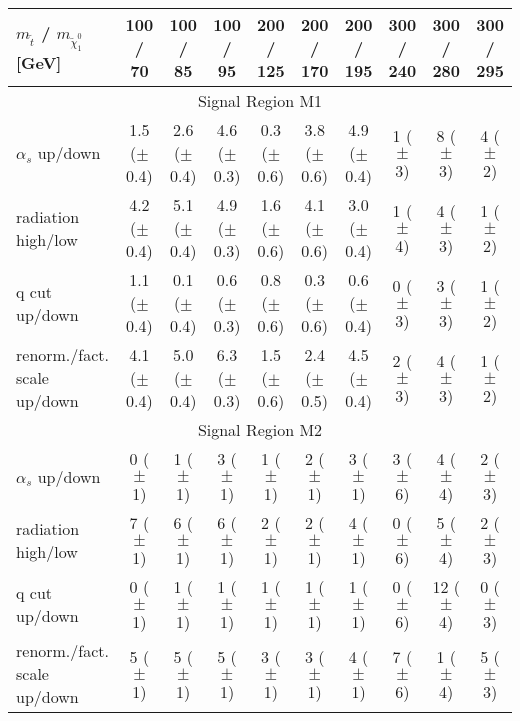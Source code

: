 \begin{sidewaystable}[h!]
\begin{center}
\begin{small}
\begin{tabular}{lccccccccc}
\hline\hline
$m_{\tilde{t}}$ / $m_{\tilde{\chi}_1^0}$ [GeV]  & 100 / 70 & 100 / 85 & 100 / 95 & 200 / 125 & 200 / 170 & 200 / 195 & 300 / 240 & 300 / 280 & 300 / 295\\
    \hline
    \multicolumn{10}{c}{Signal Region M1}\\
      \hline
      $\alpha_s$ up/down  & 1.5  ($\pm$ 0.4) &  2.6  ($\pm$ 0.4)  &  4.6   ($\pm$ 0.3)  &  0.3   ($\pm$ 0.6)  &  3.8   ($\pm$ 0.6)  &  4.9   ($\pm$ 0.4)  &  1   ($\pm$ 3)  &  8   ($\pm$ 3) &  4   ($\pm$ 2) \\
        radiation high/low  & 4.2   ($\pm$ 0.4)  &  5.1   ($\pm$ 0.4)  &  4.9   ($\pm$ 0.3)  &  1.6   ($\pm$ 0.6)  &  4.1   ($\pm$ 0.6)  &  3.0   ($\pm$ 0.4)  &  1   ($\pm$ 4)  &  4   ($\pm$ 3)  &  1   ($\pm$ 2)\\
        q cut up/down       &  1.1   ($\pm$ 0.4)  &  0.1   ($\pm$ 0.4)  &  0.6   ($\pm$ 0.3)  &  0.8   ($\pm$ 0.6)  &  0.3   ($\pm$ 0.6)  &  0.6   ($\pm$ 0.4)  &  0   ($\pm$ 3)  &  3   ($\pm$ 3)  &  1   ($\pm$ 2)\\
        renorm./fact. scale up/down &  4.1   ($\pm$ 0.4)  &  5.0   ($\pm$ 0.4)  &  6.3   ($\pm$ 0.3)  &  1.5   ($\pm$ 0.6)  &  2.4   ($\pm$ 0.5)  &  4.5   ($\pm$ 0.4)  &  2   ($\pm$ 3)  &  4   ($\pm$ 3)  &  1   ($\pm$ 2)\\
        \hline
            \multicolumn{10}{c}{Signal Region M2}\\
              \hline
              $\alpha_s$ up/down   &  0   ($\pm$ 1)  &  1   ($\pm$ 1)  &  3   ($\pm$ 1)  &  1   ($\pm$ 1) &  2   ($\pm$ 1)  &  3   ($\pm$ 1)  &  3  ($\pm$ 6)  &  4   ($\pm$ 4)  &  2   ($\pm$ 3)\\
                radiation high/low  &  7   ($\pm$ 1)  &  6   ($\pm$ 1)  &  6   ($\pm$ 1)  &  2   ($\pm$ 1)  & 2   ($\pm$ 1)  &  4   ($\pm$ 1)  &  0   ($\pm$ 6)  &  5   ($\pm$ 4)  &  2   ($\pm$ 3)\\
                q cut up/down       &  0   ($\pm$ 1)  &  1   ($\pm$ 1)  &  1   ($\pm$ 1)  &  1   ($\pm$ 1)  & 1   ($\pm$ 1)  &  1   ($\pm$ 1)  &  0   ($\pm$ 6)  &  12  ($\pm$ 4)  &  0   ($\pm$ 3)\\
                renorm./fact. scale up/down &  5   ($\pm$ 1)  &  5   ($\pm$ 1)  &  5   ($\pm$ 1)  &  3   ($\pm$ 1)  & 3   ($\pm$ 1)  &  4   ($\pm$ 1)  &  7   ($\pm$ 6)  &  1   ($\pm$ 4)  &  5   ($\pm$ 3)\\

\end{tabular}
\end{small}
\end{center}
\end{sidewaystable}
